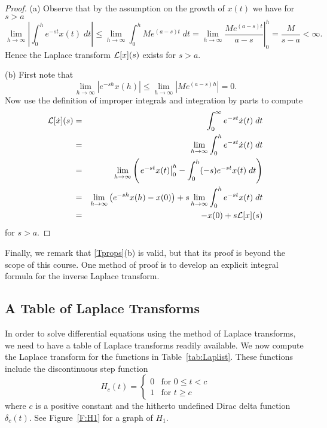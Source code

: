 \documentclass{ximera}
\begin{document}
\begin{proof} 
\noindent (a) Observe that by the assumption on the growth of 
$x(t)$ we have for $s>a$
\[
\lim\limits_{h\to \infty}\left|\int_0^h e^{-st} x(t)\; dt\right|
\le \lim\limits_{h\to \infty}\int_0^h Me^{(a-s)t}\; dt
=\lim\limits_{h\to \infty}\left.\frac{Me^{(a-s)t}}{a-s}\right|_0^h
=\frac{M}{s-a}<\infty.
\]
Hence the Laplace transform ${\cal L}[x](s)$ exists for $s>a$.

\noindent(b) First note that
\[
\lim\limits_{h\to \infty} |e^{-sh} x(h)|\le
\lim\limits_{h\to \infty} |Me^{(a-s)h}| = 0.
\]
Now use the definition of improper integrals and integration by parts to 
compute 
\begin{eqnarray*}
{\cal L}[\dot x](s) &=& \int_0^{\infty} e^{-st} \dot x(t)\; dt\\
& = & \lim\limits_{h\to \infty}\int_0^h e^{-st} \dot x(t)\; dt\\
& = & \lim\limits_{h\to \infty}\left(\left.e^{-st}x(t)\right|_0^h -
\int_0^h (-s)e^{-st} x(t)\; dt\right)\\
&=& \lim\limits_{h\to \infty} \left( e^{-sh} x(h) - x(0)\right) +
s\lim\limits_{h\to \infty} \int_0^h e^{-st} x(t)\; dt\\
&=& -x(0) + s{\cal L}[x](s)
\end{eqnarray*}
for $s>a$.  \end{proof}

Finally, we remark that \eqref{Tprops}(b) is valid, but that its proof is 
beyond the scope of this course.  One method of proof is to develop an 
explicit integral formula for the inverse Laplace transform. 


\subsection*{A Table of Laplace Transforms}

In order to solve differential equations using the method of Laplace 
transforms, we need to have a table of Laplace transforms readily available.  
We now compute the Laplace transform for the functions in 
Table~\ref{tab:Laplist}.   These functions include the discontinuous step 
function 
\[
H_c(t) = \left\{\begin{array}{ll}
0 & \mbox{for $0\le t < c$}\\
1 & \mbox{for $t\ge c$}
\end{array}\right. 
\]
where $c$ is a positive constant and the hitherto undefined Dirac delta 
function $\delta_c(t)$.  See Figure~\ref{F:H1} for a graph of $H_1$.
\end{document}

